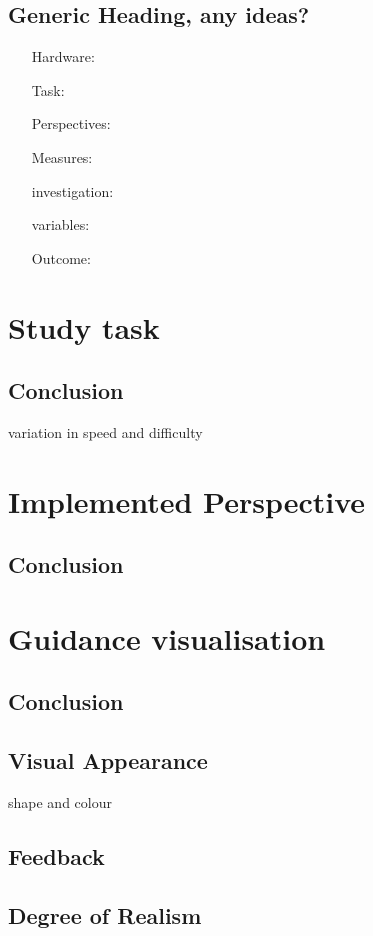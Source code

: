 \subsection{Generic Heading, any ideas? \todo}
\begin{itemize}
	\item[Hardware:] 
	\item[Task:] 
	\item[Perspectives:] 
	\item[Measures:] 
	\item[investigation:] 
	\item[variables:] 
	\item[Outcome:] 
\end{itemize}

\section{Study task}
\subsection{Conclusion}
variation in speed and difficulty

\section{Implemented Perspective}
\subsection{Conclusion}

\section{Guidance visualisation}
\subsection{Conclusion}

\subsection{Visual Appearance}
shape and colour
\subsection{Feedback}
\subsection{Degree of Realism}

